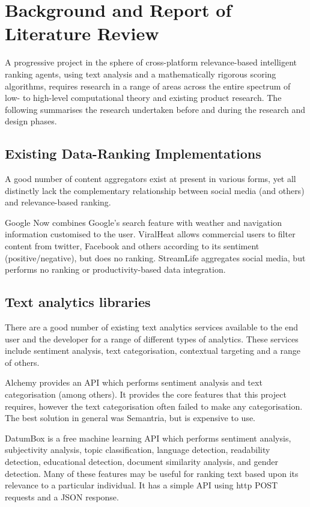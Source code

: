 \chapter{Background and Report of Literature Review}

A progressive project in the sphere of cross-platform relevance-based intelligent ranking agents, using text analysis and a mathematically rigorous scoring algorithms, requires research in a range of areas across the entire spectrum of low- to high-level computational theory and existing product research. The following summarises the research undertaken before and during the research and design phases.

\section{Existing Data-Ranking Implementations}

A good number of content aggregators exist at present in various forms, yet all distinctly lack the complementary relationship between social media (and others) and relevance-based ranking. 

Google Now combines Google's search feature with weather and navigation information customised to the user. ViralHeat allows commercial users to filter content from twitter, Facebook and others according to its sentiment (positive/negative), but does no ranking. StreamLife aggregates social media, but performs no ranking or productivity-based data integration. 

\section{Text analytics libraries}

There are a good number of existing text analytics services available to the end user and the developer for a range of different types of analytics. These services include sentiment analysis, text categorisation, contextual targeting and a range of others. 

Alchemy provides an API which performs sentiment analysis and text categorisation (among others). It provides the core features that this project requires, however the text categorisation often failed to make any categorisation. The best solution in general was Semantria, but is expensive to use. 

DatumBox is a free machine learning API which performs sentiment analysis, subjectivity analysis, topic classification, language detection, readability detection, educational detection, document similarity analysis, and gender detection. Many of these features may be useful for ranking text based upon its relevance to a particular individual. It has a simple API using http POST requests and a JSON response. 

